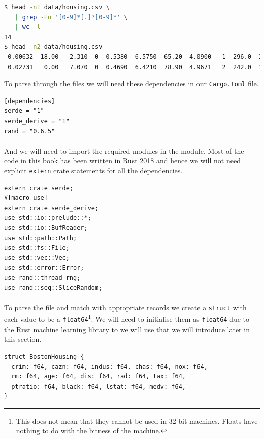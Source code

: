 \documentclass{book}
\begin{document}
\begin{lstlisting}[language=bash,caption={housing data}]
$ head -n1 data/housing.csv \
   | grep -Eo '[0-9]*[.]?[0-9]*' \
   | wc -l
14
$ head -n2 data/housing.csv
 0.00632  18.00   2.310  0  0.5380  6.5750  65.20  4.0900   1  296.0  15.30 396.90   4.98  24.00
 0.02731   0.00   7.070  0  0.4690  6.4210  78.90  4.9671   2  242.0  17.80 396.90   9.14  21.60
\end{lstlisting}

To parse through the files we will need these dependencies in our \lstinline{Cargo.toml} file.

\begin{lstlisting}[caption={Cargo.toml}]
[dependencies]
serde = "1"
serde_derive = "1"
rand = "0.6.5"
\end{lstlisting}

\paragraph{}%
And we will need to import the required modules in the module. Most of the code in this book has been written in Rust 2018 and hence we will not need explicit \lstinline{extern} crate statements for all the dependencies.
\label{par:import_required_modules}

\begin{lstlisting}[caption={regression}]
extern crate serde;
#[macro_use]
extern crate serde_derive;
use std::io::prelude::*;
use std::io::BufReader;
use std::path::Path;
use std::fs::File;
use std::vec::Vec;
use std::error::Error;
use rand::thread_rng;
use rand::seq::SliceRandom;

\end{lstlisting}

\paragraph{}%
To parse the file and match with appropriate records we create a \lstinline{struct} with each value to be a \lstinline{float64}\footnote{This does not mean that they cannot be used in 32-bit machines. Floats have nothing to do with the bitness of the machine.}. We will need to initialise them as \lstinline{float64} due to the Rust machine learning library to we will use that we will introduce later in this section.
\label{par:}

\begin{lstlisting}[caption={chapter2\\/ml\\-utils\\/src\\/datasets\\.rs}]
struct BostonHousing {
  crim: f64, cazn: f64, indus: f64, chas: f64, nox: f64,
  rm: f64, age: f64, dis: f64, rad: f64, tax: f64,
  ptratio: f64, black: f64, lstat: f64, medv: f64,
}
\end{lstlisting}
\end{document}
